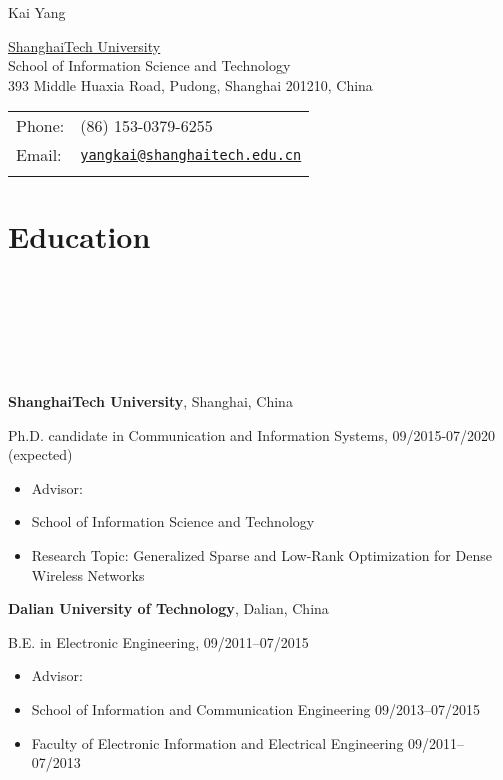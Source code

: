 \documentclass{article}
\def\name{Kai Yang}
\newcommand{\homepage}[3][homepagecolor]{\href{#2}{\color{#1}{#3}}}
\begin{document}
{\huge \name}


\vspace{0.2in}

\begin{minipage}{0.55\linewidth}
  \href{http://www.shanghaitech.edu.cn}{ShanghaiTech University} \\
  School of Information Science and Technology \\
393 Middle Huaxia Road, Pudong, Shanghai 201210, China
\end{minipage}\hspace{2em}
\begin{minipage}{0.45\linewidth}
  \begin{tabular}{ll}
    Phone: & (86) 153-0379-6255 \\
    Email: & \href{mailto:yangkai@shanghaitech.edu.cn}{\tt yangkai@shanghaitech.edu.cn} \\ &\\
  \end{tabular}
\end{minipage}


\section*{\colorbox{mygrey}{Education~~~~~~~~~~~~~~~~~~~~~~~~~~~~~~~~~~~~~~~~~~~~~~~~~~~~~~~~~~~~~~~~~~~~~~~~~~~~~~~~~~~~~~~~~~~}}
{\bf{ShanghaiTech University}}, Shanghai, China

Ph.D. candidate in Communication and Information Systems, 09/2015-07/2020 (expected) 
\begin{itemize}
  \item Advisor: \homepage{http://shiyuanming.github.io/}{Prof. Yuanming Shi}
  \item School of Information Science and Technology
  \item Research Topic: {{Generalized Sparse and Low-Rank Optimization for Dense Wireless Networks}}
\end{itemize}

{\bf{Dalian University of Technology}}, Dalian, China

B.E. in Electronic Engineering, 09/2011--07/2015
\begin{itemize}
\item Advisor: \homepage{http://faculty.dlut.edu.cn/GuoYanqing}{Prof. Yanqing Guo}
\item School of Information and Communication Engineering 09/2013--07/2015
\item Faculty of Electronic Information and Electrical Engineering 09/2011--07/2013
\end{itemize}
\end{document}
